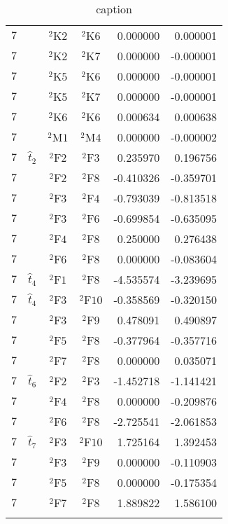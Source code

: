 \begin{longtable}{|c|c|c|c|c|c|}
    $7$ &  & ${}^{2}{\text{K2}}$ & ${}^{2}{\text{K6}}$ & \,\,0.000000 & \,\,0.000001 \\
    $7$ &  & ${}^{2}{\text{K2}}$ & ${}^{2}{\text{K7}}$ & \,\,0.000000 & -0.000001 \\
    $7$ &  & ${}^{2}{\text{K5}}$ & ${}^{2}{\text{K6}}$ & \,\,0.000000 & -0.000001 \\
    $7$ &  & ${}^{2}{\text{K5}}$ & ${}^{2}{\text{K7}}$ & \,\,0.000000 & -0.000001 \\
    $7$ &  & ${}^{2}{\text{K6}}$ & ${}^{2}{\text{K6}}$ & \,\,0.000634 & \,\,0.000638 \\
    $7$ &  & ${}^{2}{\text{M1}}$ & ${}^{2}{\text{M4}}$ & \,\,0.000000 & -0.000002 \\
    $7$ & $\hat{t}_2$ & ${}^{2}{\text{F2}}$ & ${}^{2}{\text{F3}}$ & \,\,0.235970 & \,\,0.196756 \\
    $7$ &  & ${}^{2}{\text{F2}}$ & ${}^{2}{\text{F8}}$ & -0.410326 & -0.359701 \\
    $7$ &  & ${}^{2}{\text{F3}}$ & ${}^{2}{\text{F4}}$ & -0.793039 & -0.813518 \\
    $7$ &  & ${}^{2}{\text{F3}}$ & ${}^{2}{\text{F6}}$ & -0.699854 & -0.635095 \\
    $7$ &  & ${}^{2}{\text{F4}}$ & ${}^{2}{\text{F8}}$ & \,\,0.250000 & \,\,0.276438 \\
    $7$ &  & ${}^{2}{\text{F6}}$ & ${}^{2}{\text{F8}}$ & \,\,0.000000 & -0.083604 \\
    $7$ & $\hat{t}_4$ & ${}^{2}{\text{F1}}$ & ${}^{2}{\text{F8}}$ & -4.535574 & -3.239695 \\
    $7$ & $\hat{t}_4$ & ${}^{2}{\text{F3}}$ & ${}^{2}{\text{F10}}$ & -0.358569 & -0.320150 \\
    $7$ &  & ${}^{2}{\text{F3}}$ & ${}^{2}{\text{F9}}$ & \,\,0.478091 & \,\,0.490897 \\
    $7$ &  & ${}^{2}{\text{F5}}$ & ${}^{2}{\text{F8}}$ & -0.377964 & -0.357716 \\
    $7$ &  & ${}^{2}{\text{F7}}$ & ${}^{2}{\text{F8}}$ & \,\,0.000000 & \,\,0.035071 \\
    $7$ & $\hat{t}_6$ & ${}^{2}{\text{F2}}$ & ${}^{2}{\text{F3}}$ & -1.452718 & -1.141421 \\
    $7$ &  & ${}^{2}{\text{F4}}$ & ${}^{2}{\text{F8}}$ & \,\,0.000000 & -0.209876 \\
    $7$ &  & ${}^{2}{\text{F6}}$ & ${}^{2}{\text{F8}}$ & -2.725541 & -2.061853 \\
    $7$ & $\hat{t}_7$ & ${}^{2}{\text{F3}}$ & ${}^{2}{\text{F10}}$ & \,\,1.725164 & \,\,1.392453 \\
    $7$ &  & ${}^{2}{\text{F3}}$ & ${}^{2}{\text{F9}}$ & \,\,0.000000 & -0.110903 \\
    $7$ &  & ${}^{2}{\text{F5}}$ & ${}^{2}{\text{F8}}$ & \,\,0.000000 & -0.175354 \\
    $7$ &  & ${}^{2}{\text{F7}}$ & ${}^{2}{\text{F8}}$ & \,\,1.889822 & \,\,1.586100 \\
    \hline
\caption{caption}
  \end{longtable}